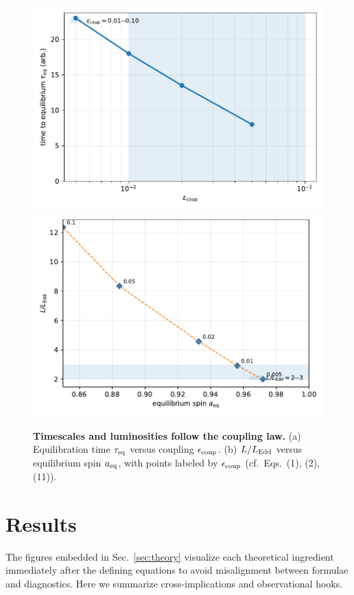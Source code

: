 \documentclass[twocolumn]{aastex701}
\begin{document}
\begin{figure}[!htbp]
  \vspace*{2pt}
  \centering
  \includegraphics[width=.95\linewidth]{Fig4a.pdf}\\[4pt]
  \includegraphics[width=.95\linewidth]{Fig4b.pdf}
  \caption{\textbf{Timescales and luminosities follow the coupling law.}
  (a) Equilibration time $\tau_{\rm eq}$ versus coupling $\epsilon_{\rm coup}$.
  (b) $L/L_{\rm Edd}$ versus equilibrium spin $a_{\rm eq}$, with points labeled by $\epsilon_{\rm coup}$ (cf.\ Eqs.~(1), (2), (11)).}
  \label{fig:fig4}
\end{figure}

\section{Results}\label{sec:results}
The figures embedded in Sec.~\ref{sec:theory} visualize each theoretical ingredient immediately after the defining equations to avoid misalignment between formulae and diagnostics. Here we summarize cross-implications and observational hooks.
\end{document}
